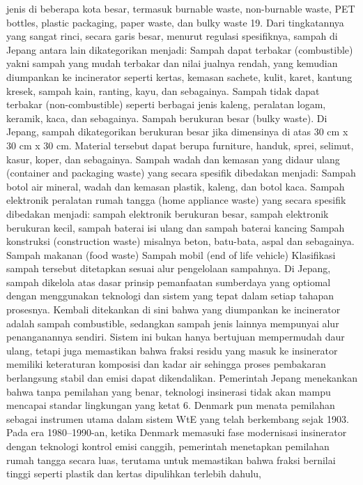 \documentclass[
  letterpaper,
  DIV=11,
  numbers=noendperiod]{scrreprt}
\begin{document}
jenis di beberapa kota besar, termasuk burnable waste, non-burnable
waste, PET bottles, plastic packaging, paper waste, dan bulky waste 19.
Dari tingkatannya yang sangat rinci, secara garis besar, menurut
regulasi spesifiknya, sampah di Jepang antara lain dikategorikan
menjadi: Sampah dapat terbakar (combustible) yakni sampah yang mudah
terbakar dan nilai jualnya rendah, yang kemudian diumpankan ke
incinerator seperti kertas, kemasan sachete, kulit, karet, kantung
kresek, sampah kain, ranting, kayu, dan sebagainya. Sampah tidak dapat
terbakar (non-combustible) seperti berbagai jenis kaleng, peralatan
logam, keramik, kaca, dan sebagainya. Sampah berukuran besar (bulky
waste). Di Jepang, sampah dikategorikan berukuran besar jika dimensinya
di atas 30 cm x 30 cm x 30 cm. Material tersebut dapat berupa furniture,
handuk, sprei, selimut, kasur, koper, dan sebagainya. Sampah wadah dan
kemasan yang didaur ulang (container and packaging waste) yang secara
spesifik dibedakan menjadi: Sampah botol air mineral, wadah dan kemasan
plastik, kaleng, dan botol kaca. Sampah elektronik peralatan rumah
tangga (home appliance waste) yang secara spesifik dibedakan menjadi:
sampah elektronik berukuran besar, sampah elektronik berukuran kecil,
sampah baterai isi ulang dan sampah baterai kancing Sampah konstruksi
(construction waste) misalnya beton, batu-bata, aspal dan sebagainya.
Sampah makanan (food waste) Sampah mobil (end of life vehicle)
Klasifikasi sampah tersebut ditetapkan sesuai alur pengelolaan
sampahnya. Di Jepang, sampah dikelola atas dasar prinsip pemanfaatan
sumberdaya yang optiomal dengan menggunakan teknologi dan sistem yang
tepat dalam setiap tahapan prosesnya. Kembali ditekankan di sini bahwa
yang diumpankan ke incinerator adalah sampah combustible, sedangkan
sampah jenis lainnya mempunyai alur penanganannya sendiri. Sistem ini
bukan hanya bertujuan mempermudah daur ulang, tetapi juga memastikan
bahwa fraksi residu yang masuk ke insinerator memiliki keteraturan
komposisi dan kadar air sehingga proses pembakaran berlangsung stabil
dan emisi dapat dikendalikan. Pemerintah Jepang menekankan bahwa tanpa
pemilahan yang benar, teknologi insinerasi tidak akan mampu mencapai
standar lingkungan yang ketat 6. Denmark pun menata pemilahan sebagai
instrumen utama dalam sistem WtE yang telah berkembang sejak 1903. Pada
era 1980--1990-an, ketika Denmark memasuki fase modernisasi insinerator
dengan teknologi kontrol emisi canggih, pemerintah menetapkan pemilahan
rumah tangga secara luas, terutama untuk memastikan bahwa fraksi
bernilai tinggi seperti plastik dan kertas dipulihkan terlebih dahulu,
\end{document}
